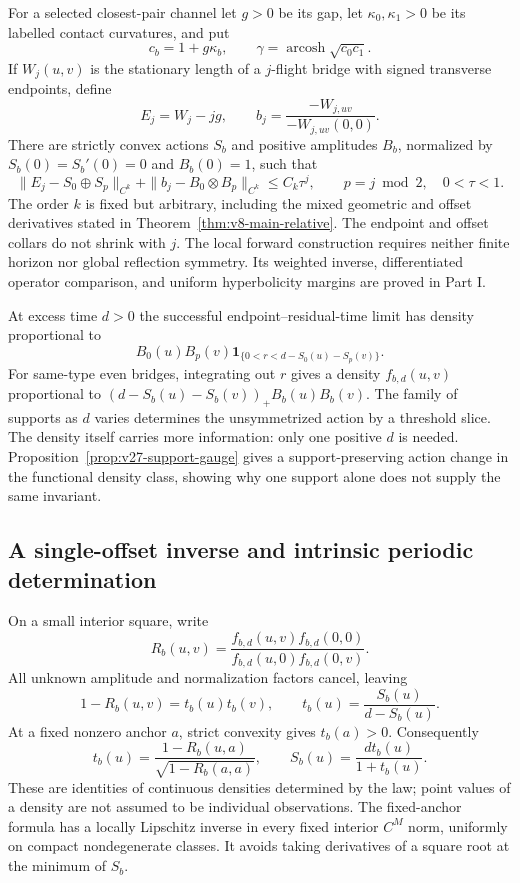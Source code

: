 For a selected closest-pair channel let \(g>0\) be its gap, let
\(\kappa_0,\kappa_1>0\) be its labelled contact curvatures, and put
\[
 c_b=1+g\kappa_b,\qquad
 \gamma=\operatorname{arcosh}\sqrt{c_0c_1}.
\]
If \(W_j(u,v)\) is the stationary length of a \(j\)-flight bridge with
signed transverse endpoints, define
\[
 E_j=W_j-jg,\qquad
 b_j=\frac{-W_{j,uv}}{-W_{j,uv}(0,0)}.
\]
There are strictly convex actions \(S_b\) and positive amplitudes \(B_b\),
normalized by \(S_b(0)=S_b'(0)=0\) and \(B_b(0)=1\), such that
\begin{equation}\label{eq:v25-intro-relative}
 \|E_j-S_0\oplus S_p\|_{C^k}
 +\|b_j-B_0\otimes B_p\|_{C^k}\le C_k\tau^j,
 \qquad p=j\bmod2,\quad 0<\tau<1.
\end{equation}
The order \(k\) is fixed but arbitrary, including the mixed geometric and
offset derivatives stated in Theorem~\ref{thm:v8-main-relative}.  The
endpoint and offset collars do not shrink with \(j\).  The local forward
construction requires neither finite horizon nor global reflection
symmetry.  Its weighted inverse, differentiated operator comparison, and
uniform hyperbolicity margins are proved in Part I.

At excess time \(d>0\) the successful endpoint--residual-time limit has
density proportional to
\[
 B_0(u)B_p(v)\mathbf1_{\{0<r<d-S_0(u)-S_p(v)\}}.
\]
For same-type even bridges, integrating out \(r\) gives a density
\(f_{b,d}(u,v)\) proportional to
\((d-S_b(u)-S_b(v))_+B_b(u)B_b(v)\).
The family of supports as \(d\) varies determines the unsymmetrized
action by a threshold slice.  The density itself carries more information:
only one positive \(d\) is needed.  Proposition~\ref{prop:v27-support-gauge}
gives a support-preserving action change in the functional density class,
showing why one support alone does not supply the same invariant.

\subsection{A single-offset inverse and intrinsic periodic determination}

On a small interior square, write
\[
 R_b(u,v)=\frac{f_{b,d}(u,v)f_{b,d}(0,0)}
                  {f_{b,d}(u,0)f_{b,d}(0,v)}.
\]
All unknown amplitude and normalization factors cancel, leaving
\begin{equation}\label{eq:v26-intro-ratio}
 1-R_b(u,v)=t_b(u)t_b(v),\qquad
 t_b(u)=\frac{S_b(u)}{d-S_b(u)}.
\end{equation}
At a fixed nonzero anchor \(a\), strict convexity gives
\(t_b(a)>0\).  Consequently
\[
 t_b(u)=\frac{1-R_b(u,a)}{\sqrt{1-R_b(a,a)}},\qquad
 S_b(u)=\frac{dt_b(u)}{1+t_b(u)}.
\]
These are identities of continuous densities determined by the law; point
values of a density are not assumed to be individual observations.  The
fixed-anchor formula has a locally Lipschitz inverse in every fixed
interior \(C^M\) norm, uniformly on compact nondegenerate classes.  It
avoids taking derivatives of a square root at the minimum of \(S_b\).

